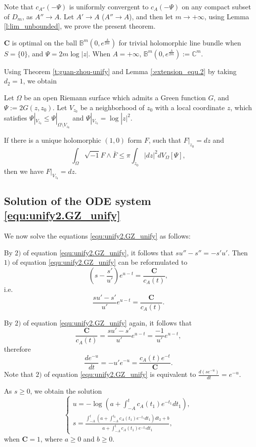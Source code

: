 Note that $c_{A''}(-\Psi)$ is uniformly convergent to $c_{A}(-\Psi)$
on any compact subset of $D_{m}$, as $A''\to A$. Let $A'\to A$
($A''\to A$), and then let $m\to+\infty$, using Lemma
\ref{l:lim_unbounded}, we prove the present theorem.

\begin{Remark}\label{r:guan-zhou-unify-exa1}
$\mathbf{C}$ is optimal on the ball $\mathbb{B}^{m}(0,e^{\frac{A}{2m}})$ for trivial
holomorphic line bundle when $S=\{0\}$, and $\Psi=2m\log|z|$.
When $A=+\infty$, $\mathbb{B}^{m}(0,e^{\frac{A}{2m}}):=\mathbb{C}^{m}$.
\end{Remark}

Using Theorem \ref{t:guan-zhou-unify} and Lemma
\ref{:extension_equ.2} by taking $d_{2}=1$, we obtain

\begin{corollary}[][][c:unify.1]
  Let $\Omega$ be an open Riemann surface which
admits a Green function $G$, and $\Psi:=2G(z,z_{0})$. Let $V_{z_0}$
be a neighborhood of $z_0$ with a local coordinate $z$, which
satisfies $\Psi|_{V_{z_0}}\leq\Psi|_{\Omega\setminus V_{z_0}}$ and
$\Psi|_{V_{z_0}}=\log|z|^{2}$.

If there is a unique holomorphic $(1,0)$ form $F$, such that
$F|_{z_0}=dz$ and
$$\int_{\Omega}\sqrt{-1}F\wedge\bar{F}\leq\pi\int_{z_{0}}|dz|^{2}dV_{\Omega}[\Psi],$$
then we have
$F|_{V_{z_0}}=dz$.
\end{corollary}

\subsection{Solution of the ODE system \ref{equ:unify2.GZ_unify}}
\label{subsec:ODE}

We now solve the equations \ref{equ:unify2.GZ_unify} as follows:

By $2)$ of equation \ref{equ:unify2.GZ_unify}, it follows that
$su''-s''=-s'u'$. Then $1)$ of equation \ref{equ:unify2.GZ_unify}
can be reformulated to
$$(s-\frac{s'}{u'})e^{u-t}=\frac{\mathbf{C}}{c_{A}(t)},$$
i.e.
$$\frac{su'-s'}{u'}e^{u-t}=\frac{\mathbf{C}}{c_{A}(t)}.$$

By $2)$ of equation \ref{equ:unify2.GZ_unify} again, it follows that
$$\frac{\mathbf{C}}{c_{A}(t)}=\frac{su'-s'}{u'}e^{u-t}=\frac{-1}{u'}e^{u-t},$$
therefore
$$\frac{de^{-u}}{dt}=-u'e^{-u}=\frac{c_{A}(t)e^{-t}}{\mathbf{C}}.$$
Note that $2)$ of equation \ref{equ:unify2.GZ_unify} is equivalent to
$\frac{d(se^{-u})}{dt}=e^{-u}$.

As $s\geq 0$, we obtain the solution
\begin{displaymath}
     \begin{cases}
      u=-\log(a+\int_{-A}^{t}c_{A}(t_{1})e^{-t_{1}}dt_{1}), \\
      s=\frac{\int_{-A}^{t}(a+\int_{-A}^{t_{2}}c_{A}(t_{1})e^{-t_{1}}dt_{1})dt_{2}+b}
      {a+\int_{-A}^{t}c_{A}(t_{1})e^{-t_{1}}dt_{1}},
      \end{cases}
\end{displaymath}
when $\mathbf{C}=1$, where $a\geq 0$ and $b\geq0$.

